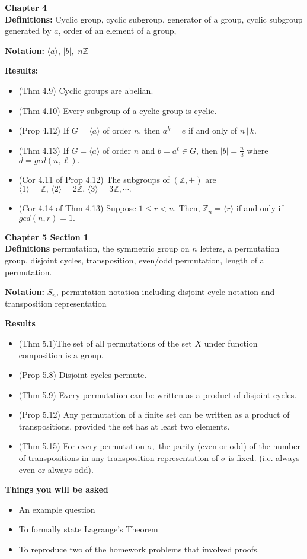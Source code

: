 \documentclass[12pt]{article}
\newcommand{\bbZ}{\mathbb{Z}}
\newcommand{\divs}{\, \big | \,}
\begin{document}
\noindent \textbf{Chapter 4}\\

\textbf{Definitions:} Cyclic group, cyclic subgroup, generator of a group, cyclic subgroup generated by $a$, order of an element of a group,

\textbf{Notation:} $\langle a \rangle$, $|b|,$ $n \bbZ$

\textbf{Results:}
\begin{itemize}
	\item (Thm 4.9) Cyclic groups are abelian.
	\item (Thm 4.10) Every subgroup of a cyclic group is cyclic.
	\item (Prop 4.12) If $G=\langle a \rangle$ of order $n$, then $a^k=e$ if and only of $n \divs k.$
	\item (Thm 4.13)  If $G=\langle a \rangle$ of order $n$ and $b=a^\ell \in G$, then $|b|=\frac{n}{d}$ where $d=gcd(n,\ell).$
	\item (Cor 4.11 of Prop 4.12) The subgroups of $(\bbZ,+)$ are $\langle 1 \rangle=\bbZ, \, \langle 2 \rangle=2\bbZ, \, \langle 3 \rangle=3\bbZ, \cdots.$
	\item  (Cor 4.14 of Thm 4.13) Suppose $1 \leq r < n.$ Then,
	$\bbZ_n=\langle r \rangle$ if and only if $gcd(n,r)=1.$
\end{itemize}



\noindent \textbf{Chapter 5 Section 1}\\

\textbf{Definitions} permutation, the symmetric group on $n$ letters, a permutation group, disjoint cycles, transposition, even/odd permutation, length of a permutation.

\textbf{Notation:} $S_n$, permutation notation including disjoint cycle notation and transposition representation

\textbf{Results}
\begin{itemize}
	\item (Thm 5.1)The set of all permutations of the set $X$ under function composition is a group.
	\item (Prop 5.8) Disjoint cycles permute.
	\item (Thm 5.9) Every permutation can be written as a product of disjoint cycles.
	\item (Prop 5.12) Any permutation of a finite set can be written as a product of transpositions, provided the set has at least two elements.
	\item (Thm 5.15) For every permutation $\sigma,$ the parity (even or odd) of the number of transpositions in any transposition representation of $\sigma$ is fixed. (i.e. always even or always odd).
\end{itemize}

\noindent \textbf{Things you will be asked}
\begin{itemize}
	\item An example question
	\item To formally state Lagrange's Theorem
	\item To reproduce two of the homework problems that involved proofs.
\end{itemize}
\end{document}
